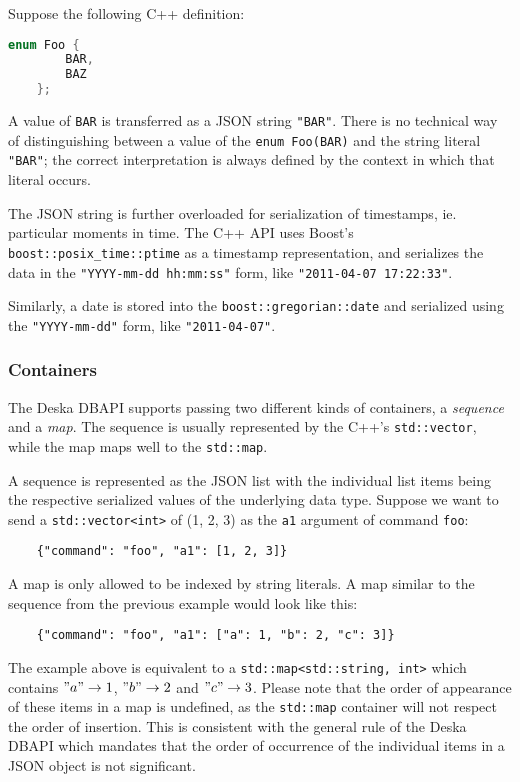 \documentclass{article}
\begin{document}
Suppose the following C++ definition:

\begin{lstlisting}[language=c++]
    enum Foo {
        BAR,
        BAZ
    };
\end{lstlisting}

A value of {\tt BAR} is transferred as a JSON string {\tt "BAR"}.  There is no technical way of distinguishing between
a value of the {\tt enum Foo(BAR)} and the string literal {\tt "BAR"}; the correct interpretation is always defined by
the context in which that literal occurs.

The JSON string is further overloaded for serialization of timestamps, ie. particular moments in time.  The C++ API uses
Boost's {\tt boost::posix\_time::ptime} as a timestamp representation, and serializes the data in the {\tt "YYYY-mm-dd
hh:mm:ss"} form, like {\tt "2011-04-07 17:22:33"}.

Similarly, a date is stored into the {\tt boost::gregorian::date} and serialized using the {\tt "YYYY-mm-dd"} form, like
{\tt "2011-04-07"}.

\subsubsection{Containers}

The Deska DBAPI supports passing two different kinds of containers, a {\em sequence} and a {\em map}.  The sequence is
usually represented by the C++'s {\tt std::vector}, while the map maps well to the {\tt std::map}.

A sequence is represented as the JSON list with the individual list items being the respective serialized values of the
underlying data type. Suppose we want to send a {\tt std::vector<int>} of (1, 2, 3) as the {\tt a1} argument of command
{\tt foo}:

\begin{lstlisting}
    {"command": "foo", "a1": [1, 2, 3]}
\end{lstlisting}

A map is only allowed to be indexed by string literals. A map similar to the sequence from the previous example would
look like this:

\begin{lstlisting}
    {"command": "foo", "a1": ["a": 1, "b": 2, "c": 3]}
\end{lstlisting}

The example above is equivalent to a {\tt std::map<std::string, int>} which contains $"a" \rightarrow 1$, $"b"
\rightarrow 2$ and $"c" \rightarrow 3$.  Please note that the order of appearance of these items in a map is undefined,
as the {\tt std::map} container will not respect the order of insertion.  This is consistent with the general rule of
the Deska DBAPI which mandates that the order of occurrence of the individual items in a JSON object is not significant.
\end{document}
